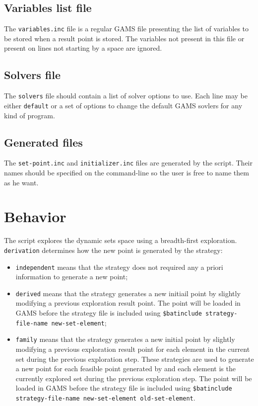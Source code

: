 \subsection*{Variables list file}

The \texttt{variables.inc} file is a regular GAMS file presenting the list of
variables to be stored when a result point is stored. The variables not present
in this file or present on lines not starting by a space are ignored.

\subsection*{Solvers file}

The \texttt{solvers} file should contain a list of solver options to use. Each
line may be either \texttt{default} or a set of options to change the default
GAMS sovlers for any kind of program.

\subsection*{Generated files}

The \texttt{set-point.inc} and \texttt{initializer.inc} files are generated by
the script. Their names should be specified on the command-line so the user is
free to name them as he want.

\section*{Behavior}

The script explores the dynamic sets space using a breadth-first
exploration. \texttt{derivation} determines how the new point is generated by
the strategy:
\begin{itemize}
\item \texttt{independent} means that the strategy does not required any a
  priori information to generate a new point;
\item \texttt{derived} means that the strategy generates a new initiail point by
  slightly modifying a previous exploration result point. The point will be
  loaded in GAMS before the strategy file is included using \texttt{\$batinclude
    strategy-file-name new-set-element};
\item \texttt{family} means that the strategy generates a new initial point by
  slightly modifying a previous exploration result point for each element in the
  current set during the previous exploration step. These strategies are used to
  generate a new point for each feasible point generated by and each element is
  the currently explored set during the previous exploration step. The point
  will be loaded in GAMS before the strategy file is included using
  \texttt{\$batinclude strategy-file-name new-set-element old-set-element}.
\end{itemize}

